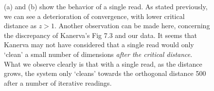 \begin{figure}[h!]
  \centering


  \caption{(a) and (b) show the behavior of a single read. As stated previously, we can see a deterioration of convergence, with lower critical distance as $z>1$.  Another observation can be made here, concerning the discrepancy of Kanerva's Fig 7.3 and our data.  It seems that Kanerva may not have considered that a single read would only `clean' a small number of dimensions \emph{after the critical distance}. What we observe clearly is that with a single read, as the distance grows, the system only `cleans' towards the orthogonal distance 500 after a number of iterative readings.}
  \label{fig:murillo-generalization-experiments}
\end{figure}

